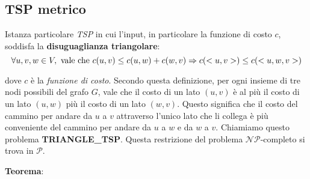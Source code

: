\label{tsp_metrico}
\subsection{TSP metrico}

Istanza particolare \textit{TSP} in cui l'input, in particolare la funzione di costo $c$, soddisfa la
\textbf{disuguaglianza triangolare}:
\[
\forall u, v, w \in V, \textnormal{ vale che } c(u, v) \le c(u, w) + c(w, v) \Rightarrow
c(<u, v>) \le c(<u, w, v>)
\]

dove $c$ è la \textit{funzione di costo}. Secondo questa definizione, per ogni insieme di tre nodi
possibili del grafo $G$, vale che il costo di un lato $(u, v)$ è al più il costo di un lato $(u, w)$
più il costo di un lato $(w, v)$. Questo significa che il costo del cammino per andare da $u$ a $v$
attraverso l'unico lato che li collega è più conveniente del cammino per andare da $u$ a $w$ e da
$w$ a $v$. Chiamiamo questo problema \textbf{TRIANGLE\_TSP}. Questa restrizione del problema
$\mathcal{NP}$-completo si trova in $\mathcal{P}$.

\textbf{Teorema}: 